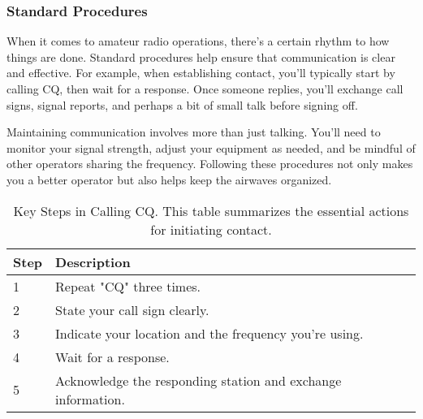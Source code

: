\subsubsection*{Standard Procedures}
When it comes to amateur radio operations, there's a certain rhythm to how things are done. Standard procedures help ensure that communication is clear and effective. For example, when establishing contact, you'll typically start by calling CQ, then wait for a response. Once someone replies, you'll exchange call signs, signal reports, and perhaps a bit of small talk before signing off.

Maintaining communication involves more than just talking. You'll need to monitor your signal strength, adjust your equipment as needed, and be mindful of other operators sharing the frequency. Following these procedures not only makes you a better operator but also helps keep the airwaves organized.



\begin{table}[h]
    \centering
    \begin{tabular}{|l|l|}
        \hline
        \textbf{Step} & \textbf{Description} \\
        \hline
        1 & Repeat "CQ" three times. \\
        2 & State your call sign clearly. \\
        3 & Indicate your location and the frequency you're using. \\
        4 & Wait for a response. \\
        5 & Acknowledge the responding station and exchange information. \\
        \hline
    \end{tabular}
    \caption{Key Steps in Calling CQ. This table summarizes the essential actions for initiating contact.}
    \label{tab:calling-cq-steps}
\end{table}
